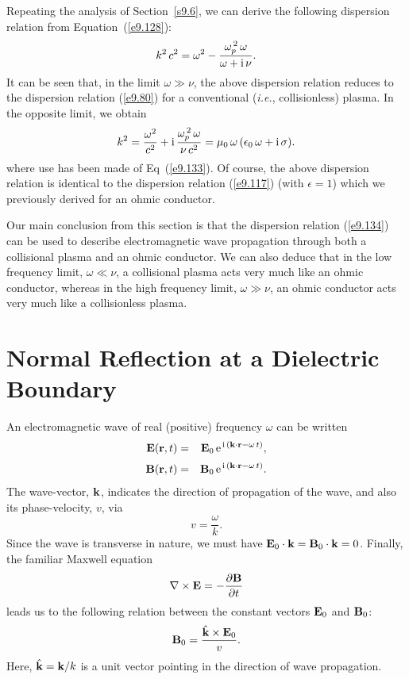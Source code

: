 Repeating the analysis of Section~\ref{s9.6}, we can derive the following
dispersion relation from Equation~(\ref{e9.128}):
\begin{equation}\label{e9.134}
k^2\,c^2 = \omega^2 - \frac{\omega_p^{\,2}\,\omega}{\omega + {\rm i}\,\nu}.
\end{equation}
It can be seen that, in the limit $\omega\gg \nu$, the above dispersion relation
reduces to the dispersion relation (\ref{e9.80}) for a conventional
({\em i.e.}, collisionless) plasma. In the opposite limit, we obtain
\begin{equation}
k^2 = \frac{\omega^2}{c^2} + {\rm i}\,\frac{\omega_p^{\,2}\,\omega}{\nu\,c^2} = \mu_0\,\omega\,(\epsilon_0\,\omega + {\rm i}\,\sigma).
\end{equation}
where use has been made of Eq~(\ref{e9.133}). Of course, the
above dispersion relation is identical to the dispersion relation (\ref{e9.117})
(with $\epsilon=1$) which we  previously derived for an ohmic
conductor.

Our main conclusion from this section is that the dispersion relation
(\ref{e9.134})
can be used to describe electromagnetic wave propagation through both a collisional plasma and an ohmic
conductor. We can also deduce that in the low frequency limit, $\omega\ll\nu$, a collisional
plasma acts very much like an ohmic conductor, whereas in the
high frequency limit, $\omega\gg \nu$, an ohmic conductor acts very much
like a collisionless plasma.

\section{Normal Reflection at a Dielectric Boundary}\label{snorm}
An electromagnetic wave of real (positive) frequency $\omega$ can be written
\begin{eqnarray}
{\bf E}({\bf r}, t) &=& {\bf E}_0\,{\rm e}^{\,{\rm i}\,({\bf k}\cdot{\bf r}-\omega\,t)},\\[0.5ex]
{\bf B}({\bf r},t) &=& {\bf B}_0\,{\rm e}^{\,{\rm i}\,({\bf k}\cdot{\bf r}-\omega\,t)}.
\end{eqnarray}
The wave-vector, ${\bf k}$, indicates the direction of propagation of the
wave, and also its phase-velocity, $v$, via
\begin{equation}
v = \frac{\omega}{k}.
\end{equation}
Since the wave is transverse in nature, we must have
${\bf E}_0\cdot{\bf k} = {\bf B}_0\cdot{\bf k} = 0$. Finally, the familiar
 Maxwell
equation
\begin{equation}
\nabla\times {\bf E} = -\frac{\partial {\bf B}}{\partial t}
\end{equation}
leads us to the following relation between the constant vectors ${\bf E}_0$ and ${\bf B}_0$:
\begin{equation}\label{e9.140}
{\bf B}_0 = \frac{\hat{\bf k}\times {\bf E}_0}{v}.
\end{equation}
Here, $\hat{\bf k} = {\bf k}/k$ is a unit vector pointing in the
direction of wave propagation.

